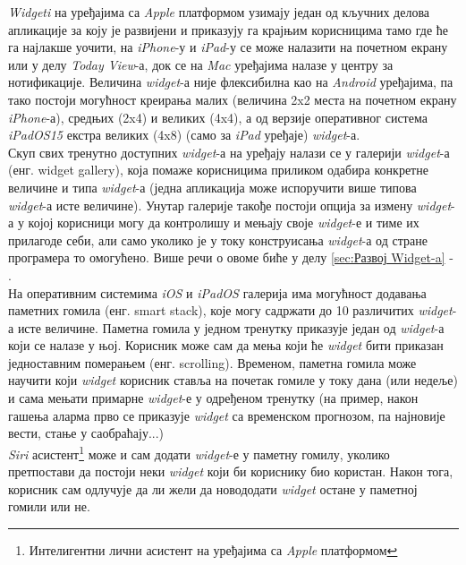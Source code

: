 \documentclass[12pt,oneside]{memoir}
\begin{document}
\indent \textit{Widgeti} на уређајима са \textit{Apple} платформом узимају један од кључних делова апликације за коју је развијени и приказују га крајњим корисницима тамо где ће га најлакше уочити, на \textit{iPhone}-у и \textit{iPad}-у се може налазити на почетном екрану или у делу \textit{Today View}-а, док се на \textit{Mac} уређајима налазе у центру за нотификације. Величина \textit{widget}-а није флексибилна као на \textit{Android} уређајима, па тако постоји могућност креирања малих (величина 2x2 места на почетном екрану \textit{iPhone}-а), средњих (2x4) и великих (4x4), а од верзије оперативног система \textit{iPadOS15} екстра великих (4x8) (само за \textit{iPad} уређаје) \textit{widget}-а. 
\\
\indent Скуп свих тренутно доступних \textit{widget}-а на уређају налази се у галерији \textit{widget}-а (енг. widget gallery), која помаже корисницима приликом одабира конкретне величине и типа \textit{widget}-а (једна апликација може испоручити више типова \textit{widget}-а исте величине). Унутар галерије такође постоји опција за измену \textit{widget}-а у којој корисници могу да контролишу и мењају своје \textit{widget}-е и тиме их прилагоде себи, али само уколико је у току конструисања \textit{widget}-а од стране програмера то омогућено. Више речи о овоме биће у делу \ref{sec:Развој Widget-a} - .
\\
\indent На оперативним системима \textit{iOS} и \textit{iPadOS} галерија има могућност додавања паметних гомила (енг. smart stack), које могу садржати до 10 различитих \textit{widget}-а исте величине. Паметна гомила у једном тренутку приказује један од \textit{widget}-а који се налазе у њој. Корисник може сам да мења који ће \textit{widget} бити приказан једноставним померањем (енг. scrolling). Временом, паметна гомила може научити који \textit{widget} корисник ставља на почетак гомиле у току дана (или недеље) и сама мењати примарне \textit{widget}-е у одређеном тренутку (на пример, након гашења аларма прво се приказује \textit{widget} са временском прогнозом, па најновије вести, стање у саобраћају...)
\\
\indent \textit{Siri} асистент\footnote{Интелигентни лични асистент на уређајима са \textit{Apple} платформом} може и сам додати \textit{widget}-е у паметну гомилу, уколико претпостави да постоји неки \textit{widget} који би кориснику био користан. Након тога, корисник сам одлучује да ли жели да новододати \textit{widget} остане у паметној гомили или не.
\end{document}
